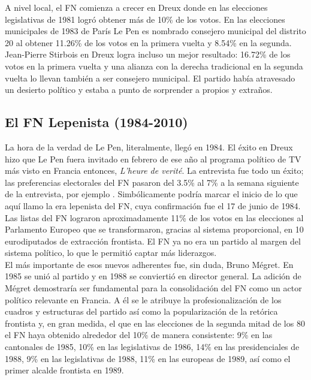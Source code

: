 A nivel local, el FN comienza a crecer en Dreux donde en las elecciones legislativas de 1981 logró obtener más de 10\% de los votos. En las elecciones municipales de 1983 de París Le Pen es nombrado consejero municipal del distrito 20 al obtener 11.26\% de los votos en la primera vuelta y 8.54\% en la segunda. Jean-Pierre Stirbois en Dreux logra incluso un mejor resultado: 16.72\% de los votos en la primera vuelta y una alianza con la derecha tradicional en la segunda vuelta lo llevan también a ser consejero municipal. El partido había atravesado un desierto político y estaba a punto de sorprender a propios y extraños.

\subsection{El FN Lepenista (1984-2010)}

La hora de la verdad de Le Pen, literalmente, llegó en 1984. El éxito en Dreux hizo que Le Pen fuera invitado en febrero de ese año al programa político de TV más visto en Francia entonces, \textit{L'heure de verité}. La entrevista fue todo un éxito; las preferencias electorales del FN pasaron del 3.5\% al 7\% a la semana siguiente de la entrevista, por ejemplo \parencite{Stockemer17}. Simbólicamente podría marcar el inicio de lo que aquí llamo la era lepenista del FN, cuya confirmación fue el 17 de junio de 1984. Las listas del FN lograron aproximadamente 11\% de los votos en las elecciones al Parlamento Europeo que se transformaron, gracias al sistema proporcional, en 10 eurodiputados de extracción frontista. El FN ya no era un partido al margen del sistema político, lo que le permitió captar más liderazgos.\\ 

El más importante de esos nuevos adherentes fue, sin duda, Bruno Mégret. En 1985 se unió al partido y en 1988 se conviertió en director general. La adición de Mégret demostraría ser fundamental para la consolidación del FN como un actor político relevante en Francia. A él se le atribuye la profesionalización de los cuadros y estructuras del partido así como la popularización de la retórica frontista y, en gran medida, el que en las elecciones de la segunda mitad de los 80 el FN haya obtenido alrededor del 10\% de manera consistente: 9\% en las cantonales de 1985, 10\% en las legislativas de 1986, 14\% en las presidenciales de 1988, 9\% en las legislativas de 1988, 11\% en las europeas de 1989, así como el primer alcalde frontista en 1989.\\ 

